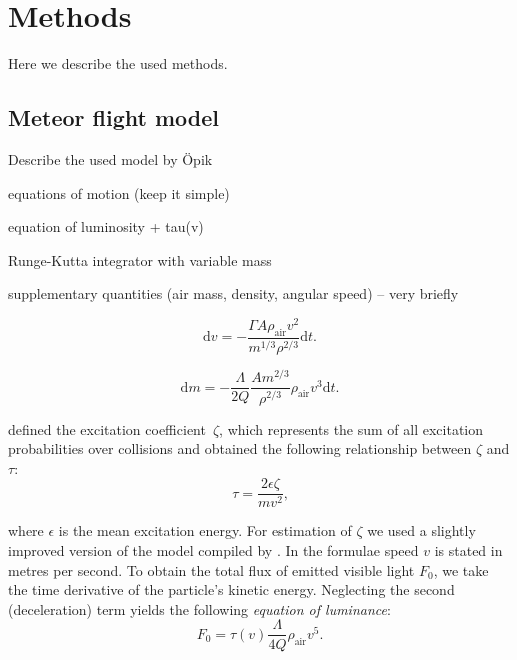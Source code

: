 \section{Methods}
    Here we describe the used methods.
    
    \subsection{Meteor flight model}
        Describe the used model by Öpik
        
        equations of motion (keep it simple)
        
        equation of luminosity + tau(v)
        
        Runge-Kutta integrator with variable mass

        supplementary quantities (air mass, density, angular speed) -- very briefly
    
        \begin{equation}
            \mathrm{d}v = -\frac{\Gamma A \rho_{\mathrm{air}} v^2}{m^{1/3} \rho^{2/3}} \mathrm{d}t\text{.}
            \label{m-dv}
        \end{equation}
        
        \begin{equation}
            \mathrm{d}m = -\frac{\Lambda}{2Q} \frac{Am^{2/3}}{\rho^{2/3}} \rho_{\mathrm{air}} v^3 \mathrm{d}t\text{.}
            \label{m-dm}
        \end{equation}
        
        \cite{jones-halliday2001} defined the excitation coefficient~$\zeta$, which represents
        the sum of all excitation probabilities over collisions and obtained the following relationship between $\zeta$ and $\tau$:
        \begin{equation}
            \tau = \frac{2\epsilon\zeta}{mv^2}\text{,}
            \label{m-tau}
        \end{equation}
    
        where $\epsilon$ is the mean excitation energy. For estimation of $\zeta$ we used a slightly improved version of the
        model compiled by \cite{hill2005}. In the formulae speed $v$ is stated in metres per second.
        To obtain the total flux of emitted visible light $F_0$, we take the time derivative of the particle's kinetic energy.
        Neglecting the second (deceleration) term yields the following \emph{equation of luminance}:
        \begin{equation}
            F_0 = \tau(v) \frac{\Lambda}{4Q} \rho_{\mathrm{air}} v^5\text{.}
            \label{m-f0}
        \end{equation}
        
